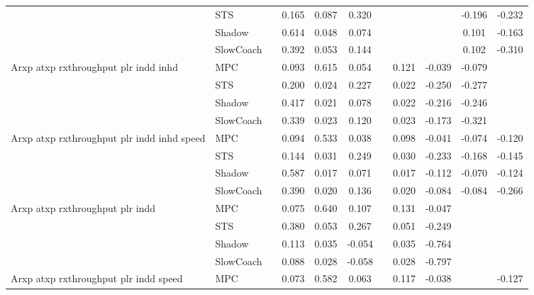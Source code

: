\begin{tabular}{|l|l|*{9}{c|}}
                              & STS &       &     0.165 &     0.087 &  0.320 &     &     &      &  -0.196 &   -0.232 \\
                              & Shadow &       &     0.614 &     0.048 &  0.074 &     &     &      &   0.101 &   -0.163 \\
                              & SlowCoach &       &     0.392 &     0.053 &  0.144 &     &     &      &   0.102 &   -0.310 \\
\midrule
Arxp atxp rxthroughput plr indd inhd    & MPC &       &     0.093 &     0.615 &  0.054 &     &  0.121 &  -0.039 &  -0.079 &       \\
                              & STS &       &     0.200 &     0.024 &  0.227 &     &  0.022 &  -0.250 &  -0.277 &       \\
                              & Shadow &       &     0.417 &     0.021 &  0.078 &     &  0.022 &  -0.216 &  -0.246 &       \\
                              & SlowCoach &       &     0.339 &     0.023 &  0.120 &     &  0.023 &  -0.173 &  -0.321 &       \\
\midrule
Arxp atxp rxthroughput plr indd inhd speed    & MPC &       &     0.094 &     0.533 &  0.038 &     &  0.098 &  -0.041 &  -0.074 &   -0.120 \\
                              & STS &       &     0.144 &     0.031 &  0.249 &     &  0.030 &  -0.233 &  -0.168 &   -0.145 \\
                              & Shadow &       &     0.587 &     0.017 &  0.071 &     &  0.017 &  -0.112 &  -0.070 &   -0.124 \\
                              & SlowCoach &       &     0.390 &     0.020 &  0.136 &     &  0.020 &  -0.084 &  -0.084 &   -0.266 \\
\midrule
Arxp atxp rxthroughput plr indd    & MPC &       &     0.075 &     0.640 &  0.107 &     &  0.131 &  -0.047 &      &       \\
                              & STS &       &     0.380 &     0.053 &  0.267 &     &  0.051 &  -0.249 &      &       \\
                              & Shadow &       &     0.113 &     0.035 & -0.054 &     &  0.035 &  -0.764 &      &       \\
                              & SlowCoach &       &     0.088 &     0.028 & -0.058 &     &  0.028 &  -0.797 &      &       \\
\midrule
Arxp atxp rxthroughput plr indd speed    & MPC &       &     0.073 &     0.582 &  0.063 &     &  0.117 &  -0.038 &      &   -0.127 \\

\end{tabular}
